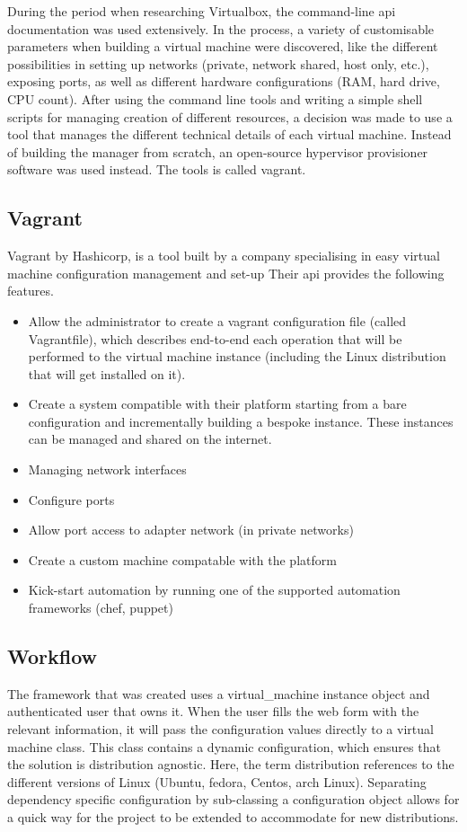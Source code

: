 \documentclass{article}
\begin{document}
During the period when researching Virtualbox, the command-line \gls{api} documentation was used extensively. In the process, a variety of customisable parameters when building a virtual machine were discovered, like the different possibilities in setting up networks (private, network shared, host only, etc.), exposing ports, as well as different hardware configurations (RAM, hard drive, CPU count). After using the command line tools and writing a simple shell scripts for managing creation of different resources, a decision was made to use a tool that manages the different technical details of each virtual machine. Instead of building the manager from scratch, an open-source hypervisor provisioner software was used instead. The tools is called \gls{vagrant}.

\subsection{Vagrant}
Vagrant by Hashicorp, is a tool built by a company specialising in easy virtual machine configuration management and set-up Their \gls{api} provides the following features.

\begin{itemize}
	\item
	Allow the administrator to create a \gls{vagrant} configuration file (called Vagrantfile), which describes end-to-end each operation that will be performed to the virtual machine instance (including the Linux distribution that will get installed on it).
	\item
	Create a system compatible with their platform starting from a bare configuration and incrementally building a bespoke instance. These instances can be managed and shared on the internet.
	\item
	Managing network interfaces
	\item
	Configure ports
	\item
	Allow port access to adapter network (in private networks)
	\item
	Create a custom machine compatable with the platform
	\item 
	Kick-start automation by running one of the supported automation frameworks (chef, puppet)
\end{itemize}

\subsection{Workflow}
The framework that was created uses a \gls{virtual_machine} instance object and authenticated user that owns it. When the user fills the web form with the relevant information, it will pass the configuration values directly to a virtual machine class. This class contains a dynamic configuration, which ensures that the solution is distribution agnostic. Here, the term distribution references to the different versions of Linux (Ubuntu, fedora, Centos, arch Linux). Separating dependency specific configuration by sub-classing a configuration object allows for a quick way for the project to be extended to accommodate for new distributions.
\end{document}
